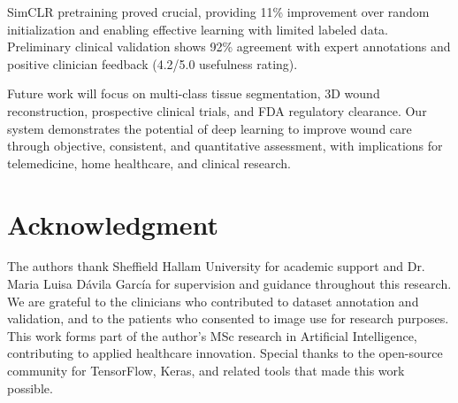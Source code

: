 \documentclass[conference]{IEEEtran}
\begin{document}
SimCLR pretraining proved crucial, providing 11\% improvement over random initialization and enabling effective learning with limited labeled data. Preliminary clinical validation shows 92\% agreement with expert annotations and positive clinician feedback (4.2/5.0 usefulness rating).

Future work will focus on multi-class tissue segmentation, 3D wound reconstruction, prospective clinical trials, and FDA regulatory clearance. Our system demonstrates the potential of deep learning to improve wound care through objective, consistent, and quantitative assessment, with implications for telemedicine, home healthcare, and clinical research.

\section*{Acknowledgment}
The authors thank Sheffield Hallam University for academic support and Dr. Maria Luisa Dávila García for supervision and guidance throughout this research. We are grateful to the clinicians who contributed to dataset annotation and validation, and to the patients who consented to image use for research purposes. This work forms part of the author's MSc research in Artificial Intelligence, contributing to applied healthcare innovation. Special thanks to the open-source community for TensorFlow, Keras, and related tools that made this work possible.
\end{document}

